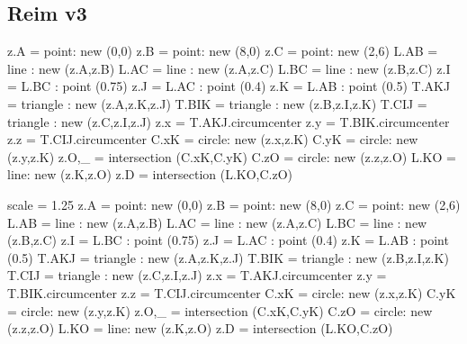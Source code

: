 \subsection{Reim v3} %
\label{sub:reim_v3}
\begin{tkzexample}[latex=0cm,small,code only]
\begin{tkzelements}
   z.A     = point: new (0,0)
   z.B     = point: new (8,0)
   z.C     = point: new (2,6)
   L.AB    = line : new (z.A,z.B)
   L.AC    = line : new (z.A,z.C)
   L.BC    = line : new (z.B,z.C)
   z.I     = L.BC : point (0.75)
   z.J     = L.AC : point (0.4)
   z.K     = L.AB : point (0.5)
   T.AKJ   = triangle : new (z.A,z.K,z.J)
   T.BIK   = triangle : new (z.B,z.I,z.K)
   T.CIJ   = triangle : new (z.C,z.I,z.J)
   z.x     = T.AKJ.circumcenter
   z.y     = T.BIK.circumcenter
   z.z     = T.CIJ.circumcenter
   C.xK    = circle: new (z.x,z.K)
   C.yK    = circle: new (z.y,z.K)
   z.O,_   = intersection (C.xK,C.yK)
   C.zO    = circle: new (z.z,z.O)
   L.KO    = line: new (z.K,z.O)
   z.D     = intersection (L.KO,C.zO)
\end{tkzelements}

\end{tkzexample}

\begin{tkzelements}
   scale = 1.25
   z.A     = point: new (0,0)
   z.B     = point: new (8,0)
   z.C     = point: new (2,6)
   L.AB    = line : new (z.A,z.B)
   L.AC    = line : new (z.A,z.C)
   L.BC    = line : new (z.B,z.C)
   z.I     = L.BC : point (0.75)
   z.J     = L.AC : point (0.4)
   z.K     = L.AB : point (0.5)
   T.AKJ   = triangle : new (z.A,z.K,z.J)
   T.BIK   = triangle : new (z.B,z.I,z.K)
   T.CIJ   = triangle : new (z.C,z.I,z.J)
   z.x     = T.AKJ.circumcenter
   z.y     = T.BIK.circumcenter
   z.z     = T.CIJ.circumcenter
   C.xK    = circle: new (z.x,z.K)
   C.yK    = circle: new (z.y,z.K)
   z.O,_   = intersection (C.xK,C.yK)
   C.zO    = circle: new (z.z,z.O)
   L.KO    = line: new (z.K,z.O)
   z.D     = intersection (L.KO,C.zO)
\end{tkzelements}

